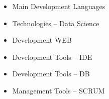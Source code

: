 
\begin{itemize}
\item \textcolor{emphasis}{Main Development Languages} 
\end{itemize}

\cvtag{\LaTeX}

\divider\smallskip

\begin{itemize}
\item \textcolor{emphasis}{Technologies -- Data Science}
\end{itemize}
  
\divider\smallskip



\begin{itemize}
\item \textcolor{emphasis}{Development WEB}
\end{itemize}
\divider\smallskip

\begin{itemize}
\item \textcolor{emphasis}{Development Tools -- IDE}
\end{itemize}
\divider\smallskip

\begin{itemize}
\item \textcolor{emphasis}{Development Tools -- DB}
\end{itemize}
\divider\smallskip

\begin{itemize}
\item \textcolor{emphasis}{Management Tools -- SCRUM}
\end{itemize}
\divider\smallskip

\divider
{}
\divider
{}
\divider
{}


